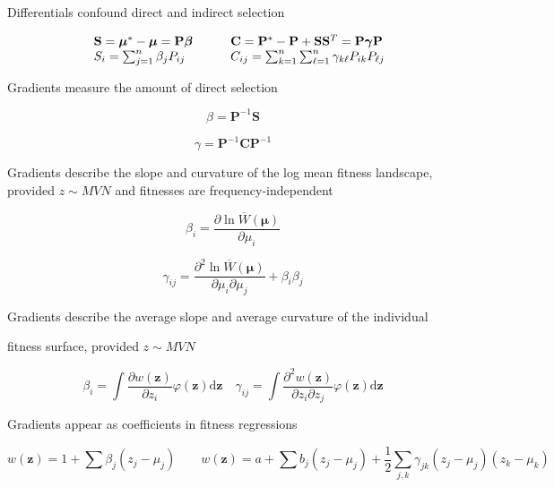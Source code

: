 \documentclass{article}
\begin{document}
Differentials confound direct and indirect selection

\begin{equation}
\begin{array}{r l r l}&{\mathbf{S}=\boldsymbol{\mu}^{*}-\boldsymbol{\mu}=\mathbf{P}\boldsymbol{\beta}}&&{\quad\mathbf{C}=\mathbf{P}^{*}-\mathbf{P}+\mathbf{S}\mathbf{S}^{T}=\mathbf{P}\boldsymbol{\gamma}\mathbf{P}}\\ &{S_{i}=\sum_{j=1}^{n}\beta_{j}P_{i j}}&&{\quad C_{i j}=\sum_{k=1}^{n}\sum_{\ell=1}^{n}\gamma_{k\ell}P_{i k}P_{\ell j}}\end{array}
\end{equation}

Gradients measure the amount of direct selection

\begin{equation}
\beta=\mathbf{P}^{-1}\mathbf{S}
\end{equation}

\begin{equation}
\gamma=\mathbf{P}^{-1}\mathbf{C}\mathbf{P}^{-1}
\end{equation}

Gradients describe the slope and curvature of the log mean fitness landscape, provided  $ z \sim MVN $ and fitnesses are frequency-independent

\begin{equation}
\beta_{i}=\frac{\partial\ln\overline{W}(\pmb{\mu})}{\partial\mu_{i}}
\end{equation}

\begin{equation}
\gamma_{ij}=\frac{\partial^{2}\ln\overline{W}(\boldsymbol{\mu})}{\partial\mu_{i}\partial\mu_{j}}+\beta_{i}\beta_{j}
\end{equation}

Gradients describe the average slope and average curvature of the individual

fitness surface, provided  $ z \sim MVN $

\begin{equation}
\beta_{i}=\int\frac{\partial w(\mathbf{z})}{\partial z_{i}}\varphi(\mathbf{z})\mathrm{d}\mathbf{z}\quad\gamma_{i j}=\int\frac{\partial^{2}w(\mathbf{z})}{\partial z_{i}\partial z_{j}}\varphi(\mathbf{z})\mathrm{d}\mathbf{z}
\end{equation}

Gradients appear as coefficients in fitness regressions

\begin{equation}
w(\mathbf{z})=1+\sum\beta_{j}\left(z_{j}-\mu_{j}\right)\qquad w(\mathbf{z})=a+\sum b_{j}\left(z_{j}-\mu_{j}\right)+\frac{1}{2}\sum_{j,k}\gamma_{j k}\left(z_{j}-\mu_{j}\right)(z_{k}-\mu_{k})
\end{equation}
\end{document}
